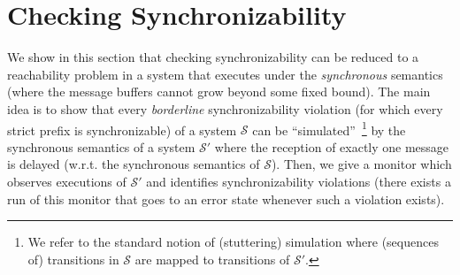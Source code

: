 \section{Checking Synchronizability}

We show in this section that checking synchronizability can be reduced 
to a reachability problem in a system that executes under the \emph{synchronous} semantics 
(where the message buffers cannot grow beyond some fixed bound). The main idea is to show that every
\emph{borderline} synchronizability violation (for which every strict prefix is synchronizable) of a system $\mathcal{S}$ can be ``simulated''~\footnote{We refer to the standard notion of (stuttering) simulation where (sequences of) transitions in $\mathcal{S}$ are mapped to transitions of $\mathcal{S'}$.}
by the synchronous semantics of a system $\mathcal{S'}$ where the reception of exactly one message is delayed (w.r.t. the synchronous semantics of $\mathcal{S}$).
Then, we give a monitor which observes executions of $\mathcal{S'}$ and identifies synchronizability violations
(there exists a run of this monitor that goes to an error state whenever such a violation exists).


